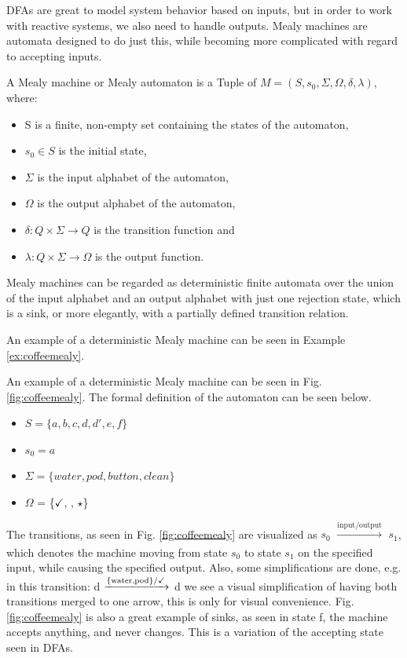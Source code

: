 DFAs are great to model system behavior based on inputs, but in order to work with reactive systems, we also need to handle outputs. Mealy machines are automata designed to do just this, while becoming more complicated with regard to accepting inputs.


\begin{definition}
	A Mealy machine or Mealy automaton is a Tuple of $ M=(S,s_{0},\Sigma,\Omega,\delta,\lambda) $, where:
	\begin{itemize}
		\item S is a finite, non-empty set containing the states of the automaton,
		\item $s_{0} \in S$ is the initial state,
		\item $\Sigma$ is the input alphabet of the automaton,
		\item $\Omega$ is the output alphabet of the automaton,
		\item $\delta: Q\times \Sigma \to Q$ is the transition function and
		\item $\lambda: Q\times \Sigma \to \Omega$ is the output function. 
	\end{itemize}
\end{definition}

Mealy machines can be regarded as deterministic finite automata over the union of the input alphabet and an output alphabet with just one rejection state, which is a sink, or more elegantly, with a partially defined transition relation. 

An example of a deterministic Mealy machine can be seen in Example \ref{ex:coffeemealy}.

\begin{example}
	\label{ex:coffeemealy}
	An example of a deterministic Mealy machine can be seen in Fig. \ref{fig:coffeemealy}. The formal definition of the automaton can be seen below.
	\begin{itemize} 
		\item $S = \{a, b, c, d, d', e, f\}$ 
		\item $s_0 = a$
		\item $\Sigma = \{water, pod, button, clean\}$
		\item $\Omega$ = \{$\checkmark$, \Coffeecup, $\star$\}
	\end{itemize}
	The transitions, as seen in Fig. \ref{fig:coffeemealy} are visualized as $s_0$ $\xrightarrow[]{\text{input/output}}$ $s_1$, which denotes the machine moving from state $s_0$ to state $s_1$ on the specified input, while causing the specified output. Also, some simplifications are done, e.g. in this transition: d $\xrightarrow[]{\text{\{water,pod\}/\checkmark}}$ d we see a visual simplification of having both transitions merged to one arrow, this is only for visual convenience. Fig. \ref{fig:coffeemealy} is also a great example of sinks, as seen in state f, the machine accepts anything, and never changes. This is a variation of the accepting state seen in DFAs.
\end{example}

